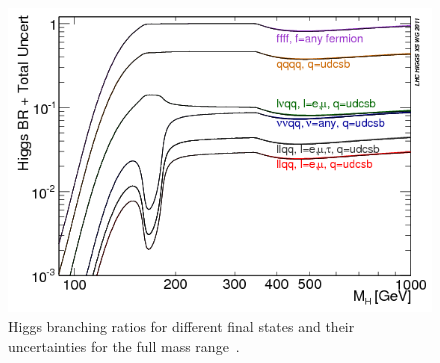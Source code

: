 \begin{figure}
\centering
\includegraphics[scale= 0.6]{../Cap1/BRTotalUncertBands4f2}
\caption{Higgs branching ratios for different final states and their uncertainties for the full mass range~\cite{Denner:2011mq}.}
\label{brqq}
\end{figure}



